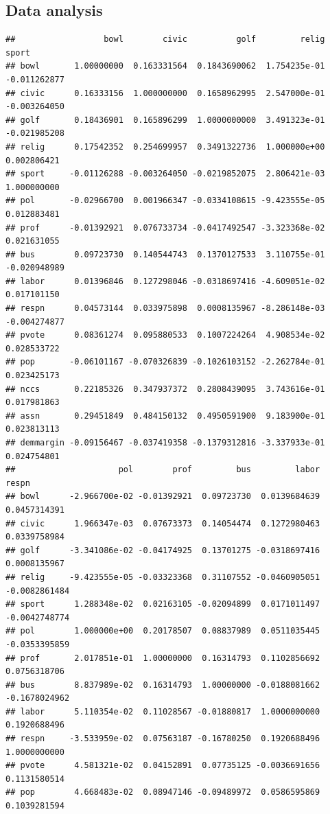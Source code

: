 \documentclass[
  english,
  man]{apa6}
\begin{document}
\hypertarget{data-analysis}{%
\subsection{Data analysis}\label{data-analysis}}

\begin{verbatim}
##                  bowl        civic          golf         relig        sport
## bowl       1.00000000  0.163331564  0.1843690062  1.754235e-01 -0.011262877
## civic      0.16333156  1.000000000  0.1658962995  2.547000e-01 -0.003264050
## golf       0.18436901  0.165896299  1.0000000000  3.491323e-01 -0.021985208
## relig      0.17542352  0.254699957  0.3491322736  1.000000e+00  0.002806421
## sport     -0.01126288 -0.003264050 -0.0219852075  2.806421e-03  1.000000000
## pol       -0.02966700  0.001966347 -0.0334108615 -9.423555e-05  0.012883481
## prof      -0.01392921  0.076733734 -0.0417492547 -3.323368e-02  0.021631055
## bus        0.09723730  0.140544743  0.1370127533  3.110755e-01 -0.020948989
## labor      0.01396846  0.127298046 -0.0318697416 -4.609051e-02  0.017101150
## respn      0.04573144  0.033975898  0.0008135967 -8.286148e-03 -0.004274877
## pvote      0.08361274  0.095880533  0.1007224264  4.908534e-02  0.028533722
## pop       -0.06101167 -0.070326839 -0.1026103152 -2.262784e-01  0.023425173
## nccs       0.22185326  0.347937372  0.2808439095  3.743616e-01  0.017981863
## assn       0.29451849  0.484150132  0.4950591900  9.183900e-01  0.023813113
## demmargin -0.09156467 -0.037419358 -0.1379312816 -3.337933e-01  0.024754801
##                     pol        prof         bus         labor         respn
## bowl      -2.966700e-02 -0.01392921  0.09723730  0.0139684639  0.0457314391
## civic      1.966347e-03  0.07673373  0.14054474  0.1272980463  0.0339758984
## golf      -3.341086e-02 -0.04174925  0.13701275 -0.0318697416  0.0008135967
## relig     -9.423555e-05 -0.03323368  0.31107552 -0.0460905051 -0.0082861484
## sport      1.288348e-02  0.02163105 -0.02094899  0.0171011497 -0.0042748774
## pol        1.000000e+00  0.20178507  0.08837989  0.0511035445 -0.0353395859
## prof       2.017851e-01  1.00000000  0.16314793  0.1102856692  0.0756318706
## bus        8.837989e-02  0.16314793  1.00000000 -0.0188081662 -0.1678024962
## labor      5.110354e-02  0.11028567 -0.01880817  1.0000000000  0.1920688496
## respn     -3.533959e-02  0.07563187 -0.16780250  0.1920688496  1.0000000000
## pvote      4.581321e-02  0.04152891  0.07735125 -0.0036691656  0.1131580514
## pop        4.668483e-02  0.08947146 -0.09489972  0.0586595869  0.1039281594

\end{verbatim}
\end{document}
